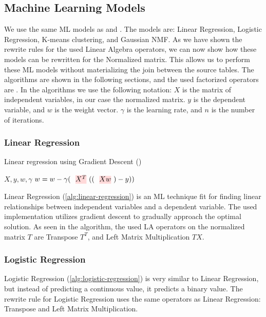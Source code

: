 \subsection{Machine Learning Models}
We use the same ML models as \cite{morpheus} and \cite{schijndel_cost_estimation}. The models are: Linear Regression, Logistic Regression, K-means clustering, and Gaussian NMF. As we have shown the rewrite rules for the used Linear Algebra operators, we can now show how these models can be rewritten for the Normalized matrix. This allows us to perform these ML models without materializing the join between the source tables. The algorithms are shown in the following sections, and the used factorized operators are . In the algorithms we use the following notation: $X$ is the matrix of independent variables, in our case the normalized matrix. $y$ is the dependent variable, and $w$ is the weight vector. $\gamma$ is the learning rate, and $n$ is the number of iterations.

\subsubsection{Linear Regression}
\begin{algorithm}[ht!]
    \caption[Linear regression]{Linear regression using Gradient Descent
        (\cite{morpheus})}\label{alg:linear-regression}
    \begin{algorithmic}
        \Require $X, y , w, \gamma$
        \State $w = w - \gamma (\text{\red{$X^T$}}((\text{\red{$X w$}}) - y))$
        \EndFor
    \end{algorithmic}
\end{algorithm}
Linear Regression (\autoref{alg:linear-regression}) is an ML technique fit for finding linear relationships between independent variables and a dependent variable. The used implementation utilizes gradient descent to gradually approach the optimal solution. As seen in the algorithm, the used LA operators on the normalized matrix $T$ are Transpose $T^T$, and Left Matrix Multiplication $TX$.

\subsubsection{Logistic Regression}
Logistic Regression (\autoref{alg:logistic-regression}) is very similar to Linear Regression, but instead of predicting a continuous value, it predicts a binary value. The rewrite rule for Logistic Regression uses the same operators as Linear Regression: Transpose and Left Matrix Multiplication.

